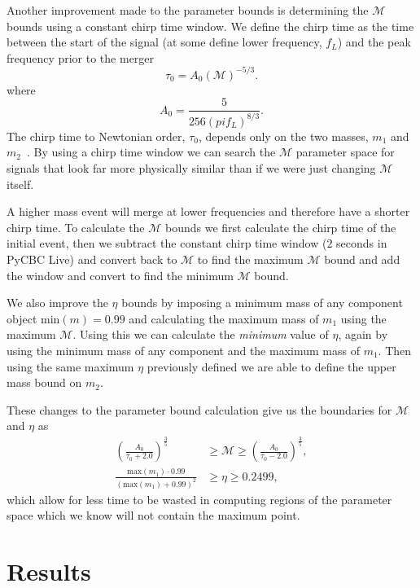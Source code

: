 Another improvement made to the parameter bounds is determining the $\mathcal{M}$ bounds using a constant chirp time window. We define the chirp time as the time between the start of the signal (at some define lower frequency, $f_{L}$) and the peak frequency prior to the merger
%
\begin{equation}
    \tau_0 = A_{0}\left(\mathcal{M}\right)^{-5/3}.
\end{equation}
%
where
%
\begin{equation}
    A_{0} = \frac{5}{256 \left(pi f_{L}\right)^{8/3}}.
\end{equation}
%
The chirp time to Newtonian order, $\tau_{0}$, depends only on the two masses, $m_{1}$ and $m_{2}$~\cite{Cokelaer:2007}. By using a chirp time window we can search the $\mathcal{M}$ parameter space for signals that look far more physically similar than if we were just changing $\mathcal{M}$ itself.

A higher mass \gwadj event will merge at lower frequencies and therefore have a shorter chirp time. To calculate the $\mathcal{M}$ bounds we first calculate the chirp time of the initial event, then we subtract the constant chirp time window ($2$ seconds in PyCBC Live) and convert back to $\mathcal{M}$ to find the maximum $\mathcal{M}$ bound and add the window and convert to find the minimum $\mathcal{M}$ bound.

We also improve the $\eta$ bounds by imposing a minimum mass of any component object $\text{min}(m) = 0.99$ and calculating the maximum mass of $m_{1}$ using the maximum $\mathcal{M}$. Using this we can calculate the \textit{minimum} value of $\eta$, again by using the minimum mass of any component and the maximum mass of $m_{1}$. Then using the same maximum $\eta$ previously defined we are able to define the upper mass bound on $m_{2}$.

These changes to the parameter bound calculation give us the boundaries for $\mathcal{M}$ and $\eta$ as
%
\begin{align}
    \left(\frac{A_{0}}{\tau_{0} + 2.0}\right)^{\frac{3}{5}} &\ge \mathcal{M} \ge \left(\frac{A_{0}}{\tau_{0} - 2.0}\right)^{\frac{3}{5}}, \\[10pt]
    \frac{\text{max}(m_{1}) \cdot 0.99}{(\text{max}(m_{1}) + 0.99)^{2}} &\ge \eta \ge 0.2499,
\end{align}
%
which allow for less time to be wasted in computing regions of the parameter space which we know will not contain the maximum point.

\section{\label{7:sec:results}Results}

